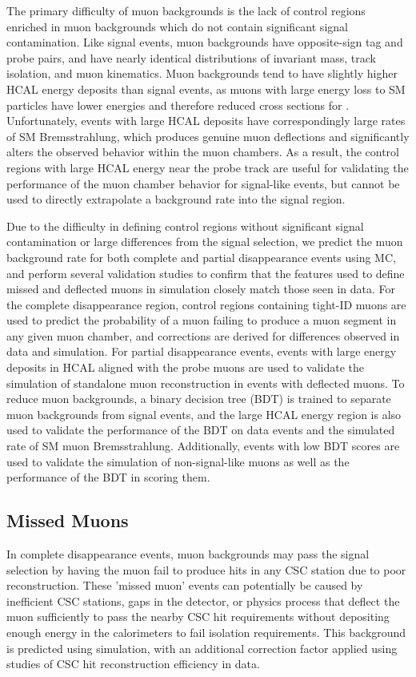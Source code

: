 The primary difficulty of muon backgrounds is the lack of control regions enriched in muon backgrounds which do not contain significant signal contamination.
Like signal events, muon backgrounds have opposite-sign tag and probe pairs, and have nearly identical distributions of invariant mass, track isolation, and muon kinematics.
Muon backgrounds tend to have slightly higher HCAL energy deposits than signal events, as muons with large energy loss to SM particles have lower energies and therefore reduced cross sections for \dbrem.
Unfortunately, events with large HCAL deposits have correspondingly large rates of SM Bremsstrahlung, which produces genuine muon deflections and significantly alters the observed behavior within the muon chambers.
As a result, the control regions with large HCAL energy near the probe track are useful for validating the performance of the muon chamber behavior for signal-like events, but cannot be used to directly extrapolate a background rate into the signal region. 

Due to the difficulty in defining control regions without significant signal contamination or large differences from the signal selection, we predict the muon background rate for both complete and partial disappearance events using MC, and perform several validation studies to confirm that the features used to define missed and deflected muons in simulation closely match those seen in data.
For the complete disappearance region, control regions containing tight-ID muons are used to predict the probability of a muon failing to produce a muon segment in any given muon chamber, and corrections are derived for differences observed in data and simulation.
For partial disappearance events, events with large energy deposits in HCAL aligned with the probe muons are used to validate the simulation of standalone muon reconstruction in events with deflected muons.
To reduce muon backgrounds, a binary decision tree (BDT) is trained to separate muon backgrounds from signal events, and the large HCAL energy region is also used to validate the performance of the BDT on data events and the simulated rate of SM muon Bremsstrahlung.
Additionally, events with low BDT scores are used to validate the simulation of non-signal-like muons as well as the performance of the BDT in scoring them.

\subsection{Missed Muons}
In complete disappearance events, muon backgrounds may pass the signal selection by having the muon fail to produce hits in any CSC station due to poor reconstruction. 
These 'missed muon' events can potentially be caused by inefficient CSC stations, gaps in the detector, or physics process that deflect the muon sufficiently to pass the nearby CSC hit requirements without depositing enough energy in the calorimeters to fail isolation requirements. 
This background is predicted using simulation, with an additional correction factor applied using studies of CSC hit reconstruction efficiency in data. 

